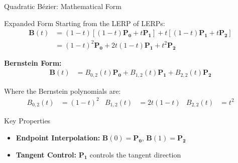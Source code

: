 \begin{frame}{Quadratic Bézier: Mathematical Form}
  \begin{mathbox}{Expanded Form}
    \small
    Starting from the LERP of LERPs:
    \begin{align*}
      \mathbf{B}(t) &= (1-t)[(1-t)\mathbf{P_0} + t\mathbf{P_1}] + t[(1-t)\mathbf{P_1} + t\mathbf{P_2}] \\
      &= (1-t)^2\mathbf{P_0} + 2t(1-t)\mathbf{P_1} + t^2\mathbf{P_2}
    \end{align*}

    \textbf{Bernstein Form:}
    \begin{align*}
      \mathbf{B}(t) &= B_{0,2}(t)\mathbf{P_0} + B_{1,2}(t)\mathbf{P_1} + B_{2,2}(t)\mathbf{P_2}
    \end{align*}

    Where the Bernstein polynomials are:
    \begin{align*}
      B_{0,2}(t) &= (1-t)^2 & B_{1,2}(t) &= 2t(1-t) & B_{2,2}(t) &= t^2
    \end{align*}
  \end{mathbox}

  \begin{conceptbox}{Key Properties}
    \footnotesize
    \begin{itemize}
      \item \textbf{Endpoint Interpolation:} $\mathbf{B}(0) = \mathbf{P_0}$, $\mathbf{B}(1) = \mathbf{P_2}$
      \item \textbf{Tangent Control:} $\mathbf{P_1}$ controls the tangent direction
    \end{itemize}
  \end{conceptbox}
\end{frame}


